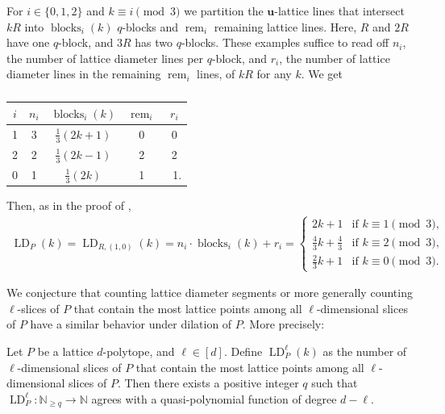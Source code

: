 \documentclass[11pt]{article}
\newcommand{\bu}{\mathbf{u}}
\newcommand{\N}{\mathbb{N}}
\DeclareMathOperator{\blocks}{blocks}
\DeclareMathOperator{\rem}{rem}
\DeclareMathOperator{\LD}{LD}
\begin{document}
\begin{example}
    For $i \in \{0, 1,2\}$ and $k \equiv i \pmod 3$ we partition the $\bu$-lattice lines that intersect $kR$ into $\blocks_i(k)$ $q$-blocks and $\rem_i$ remaining lattice lines. Here, $R$ and $2R$ have one $q$-block, and $3R$ has two $q$-blocks. These examples suffice to read off $n_i$, the number of lattice diameter lines per $q$-block, and $r_i$, the number of lattice diameter lines in the remaining $\rem_i$ lines, of $kR$ for any $k$. We get
  \begin{table}[h!]
    \centering
    \begin{tabular}{c|c|c|c|c}
    $i$ & $n_i$ & $\blocks_i(k)$ &$\rem_i$ & $r_i$\\ \hline \rule{0pt}{2.5ex}
    1 \hspace{1pt} & 3 & $\tfrac{1}{3}(2k+1)$ & 0 & 0 \\[3pt]
    2 & 2 & $\tfrac{1}{3}(2k-1)$ & 2 & 2 \\[3pt]
    0 & 1 & $\tfrac{1}{3}(2k)$ & 1 & \ 1.
    \end{tabular}\vspace{-1em}
    \caption*{}
\end{table}

\vspace{-1em}
Then, as in the proof of ,
\begin{align*}
    \LD_P(k) = \LD_{R, (1,0)}(k) = n_i \cdot \blocks_i(k)+ r_i = \begin{cases}
         2k+1 & \text{if } k \equiv 1 \pmod 3,\\
            \frac{4}{3} k + \frac{4}{3} & \text{if } k \equiv 2 \pmod 3,\\
            \frac{2}{3} k + 1 & \text{if } k \equiv 0 \pmod 3.
    \end{cases}
\end{align*}
    
\end{example}

 We conjecture that counting lattice diameter segments or more generally counting $\ell$-slices of $P$ that contain the most lattice points among all $\ell$-dimensional slices of $P$ have a similar behavior under dilation of $P$. More precisely:
 
\begin{conjecture}
   Let $P$ be a lattice $d$-polytope, and $\ell \in [d]$. Define $\LD_P^{\ell}(k)$ as the number of $\ell$-dimensional slices of $P$ that contain the most lattice points among all $\ell$-dimensional slices of $P$. Then there exists a positive integer $q$ such that $\LD_P^{\ell}:\N_{\geq q} \to \N$ agrees with a quasi-polynomial function of degree $d-\ell$.
\end{conjecture}
\end{document}
